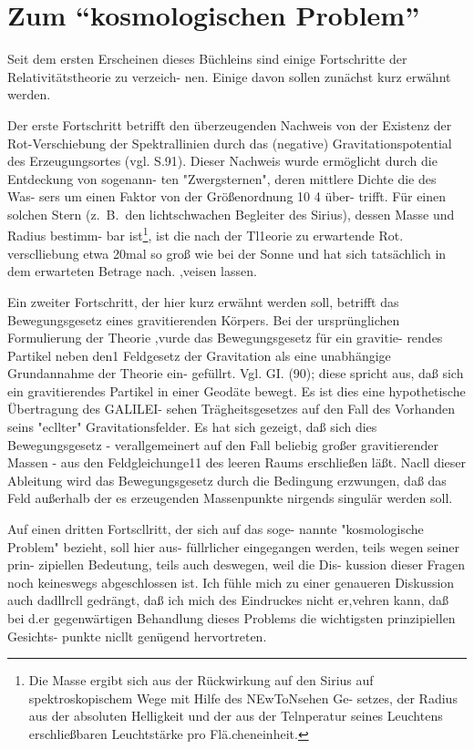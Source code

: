%
%

\section{%
Zum \enquote{kosmologischen Problem}}
\label{sec:anh-1}

Seit dem ersten Erscheinen dieses Büchleins sind
einige Fortschritte der Relativitätstheorie zu verzeich-
nen. Einige davon sollen zunächst kurz erwähnt werden.

Der erste Fortschritt betrifft den überzeugenden
Nachweis von der Existenz der Rot-Verschiebung der
Spektrallinien durch das (negative) Gravitationspotential
des Erzeugungsortes (vgl. S.91). Dieser Nachweis
wurde ermöglicht durch die Entdeckung von sogenann-
ten "Zwergsternen", deren mittlere Dichte die des Was-
sers um einen Faktor von der Größenordnung 10 4 über-
trifft. Für einen solchen Stern (z.\ B.\ den lichtschwachen
Begleiter des Sirius), dessen Masse und Radius bestimm-
bar ist\footnote{Die Masse ergibt sich aus der Rückwirkung auf den Sirius
auf spektroskopischem Wege mit Hilfe des NEwToNsehen Ge-
setzes, der Radius aus der absoluten Helligkeit und der aus der
Telnperatur seines Leuchtens erschließbaren Leuchtstärke pro
Flä.cheneinheit.}, ist die nach der Tl1eorie zu erwartende Rot.
versclliebung etwa 20mal so groß wie bei der Sonne und
hat sich tatsächlich in dem erwarteten Betrage nach.
,veisen lassen.

Ein zweiter Fortschritt, der hier kurz erwähnt werden
soll, betrifft das Bewegungsgesetz eines gravitierenden
Körpers. Bei der ursprünglichen Formulierung der
Theorie ,vurde das Bewegungsgesetz für ein gravitie-
rendes Partikel neben den1 Feldgesetz der Gravitation
als eine unabhängige Grundannahme der Theorie ein-
gefüllrt. Vgl. GI. (90); diese spricht aus, daß sich ein
gravitierendes Partikel in einer Geodäte bewegt. Es
ist dies eine hypothetische Übertragung des GALILEI-
sehen Trägheitsgesetzes auf den Fall des Vorhanden seins
"ecllter" Gravitationsfelder. Es hat sich gezeigt, daß
sich dies Bewegungsgesetz - verallgemeinert auf den
Fall beliebig großer gravitierender Massen - aus den
Feldgleichunge11 des leeren Raums erschließen läßt.
Nacll dieser Ableitung wird das Bewegungsgesetz durch
die Bedingung erzwungen, daß das Feld außerhalb der
es erzeugenden Massenpunkte nirgends singulär werden
soll.

Auf einen dritten Fortscllritt, der sich auf das soge-
nannte "kosmologische Problem" bezieht, soll hier aus-
füllrlicher eingegangen werden, teils wegen seiner prin-
zipiellen Bedeutung, teils auch deswegen, weil die Dis-
kussion dieser Fragen noch keineswegs abgeschlossen
ist. Ich fühle mich zu einer genaueren Diskussion auch
dadllrcll gedrängt, daß ich mich des Eindruckes nicht
er,vehren kann, daß bei d.er gegenwärtigen Behandlung
dieses Problems die wichtigsten prinzipiellen Gesichts-
punkte nicllt genügend hervortreten.

